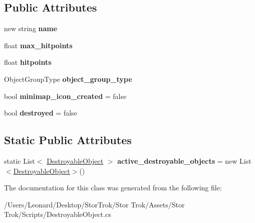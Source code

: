 \subsection*{Public Attributes}
\begin{DoxyCompactItemize}
\item 
\mbox{\label{class_destroyable_object_a133297e2d60dd4d607f75207c55915fa}} 
new string {\bfseries name}
\item 
\mbox{\label{class_destroyable_object_a42cd5aea015fb40be1ba3636aeacb3fb}} 
float {\bfseries max\+\_\+hitpoints}
\item 
\mbox{\label{class_destroyable_object_a0a4bb4823dc5a4267f7cf26e6c0a58bf}} 
float {\bfseries hitpoints}
\item 
\mbox{\label{class_destroyable_object_a9b3fb16504b02e723e8707b08b4f795b}} 
Object\+Group\+Type {\bfseries object\+\_\+group\+\_\+type}
\item 
\mbox{\label{class_destroyable_object_a4c7e19b87151f879ca10fe6a4b1672ce}} 
bool {\bfseries minimap\+\_\+icon\+\_\+created} = false
\item 
\mbox{\label{class_destroyable_object_a1430ab60ae41d40d322dca94cebec995}} 
bool {\bfseries destroyed} = false
\end{DoxyCompactItemize}
\subsection*{Static Public Attributes}
\begin{DoxyCompactItemize}
\item 
\mbox{\label{class_destroyable_object_a84ee5e7f255ba1674d29add32ef8cc9a}} 
static List$<$ \hyperlink{class_destroyable_object}{Destroyable\+Object} $>$ {\bfseries active\+\_\+destroyable\+\_\+objects} = new List$<$\hyperlink{class_destroyable_object}{Destroyable\+Object}$>$()
\end{DoxyCompactItemize}


The documentation for this class was generated from the following file\+:\begin{DoxyCompactItemize}
\item 
/\+Users/\+Leonard/\+Desktop/\+Stor\+Trok/\+Stor Trok/\+Assets/\+Stor Trok/\+Scripts/Destroyable\+Object.\+cs\end{DoxyCompactItemize}
